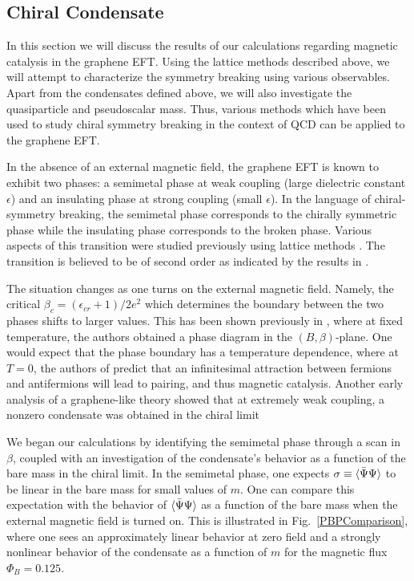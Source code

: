 \documentclass[aps,prd,twocolumn,showpacs,superscriptaddress,groupedaddress]{revtex4}  %
\begin{document}
\subsection{\label{sec:ChiralCond}Chiral Condensate}
In this section we will discuss the results of our calculations regarding magnetic catalysis in the graphene EFT. Using the lattice methods described above, we will attempt to characterize the symmetry breaking using various observables.
Apart from the condensates defined above, we will also investigate the quasiparticle and pseudoscalar mass. Thus, various methods which have been used to study chiral symmetry breaking in the
context of QCD can be applied to the graphene EFT.

In the absence of an external magnetic field, the graphene EFT is known to exhibit two phases: a semimetal phase at weak coupling (large dielectric constant $\epsilon$) and an insulating phase at strong coupling (small $\epsilon$). 
In the language of chiral-symmetry breaking, the semimetal phase corresponds to the chirally symmetric phase while the insulating phase corresponds to the broken phase.
Various aspects of this transition were studied previously using lattice methods \cite{Drut1, Drut2, Hands1, Giedt}. The transition is believed to be of second order as indicated by the results in \cite{Drut2}. 

The situation changes as one turns on the external magnetic field. Namely, the critical $\beta_c = (\epsilon_{cr}+1)/2e^2$ which determines the boundary between the two phases shifts to larger values. This has been shown previously in \cite{Polikarpov}, where at fixed temperature, the authors
obtained a phase diagram in the $(B, \beta)$-plane. One would expect that the phase boundary has a temperature dependence, where at $T=0$, the authors of \cite{Miransky1,Miransky2,Miransky3,Miransky4,MiranskyGraphene1,MiranskyGraphene2,MiranskyGraphene3} predict that an infinitesimal attraction between fermions and antifermions will lead to pairing, and thus magnetic catalysis. Another early analysis of a graphene-like theory showed that at extremely weak coupling, a nonzero condensate was obtained in the chiral limit \cite{Cosmai}

We began our calculations by identifying the semimetal phase through a scan in $\beta$, coupled with an investigation of the condensate's behavior as a function of the bare mass in the chiral limit. In the semimetal phase, one expects $\sigma \equiv {\langle {\bar \Psi}\Psi \rangle}$ to be linear in the bare mass for small values of $m$. 
One can compare this expectation with the behavior of ${\langle {\bar \Psi} \Psi \rangle}$ as a function of the bare mass when the external magnetic field is turned on. This is illustrated in Fig.~\ref{PBPComparison}, where one sees an approximately linear behavior at zero field and a strongly nonlinear behavior of the condensate as a function of $m$ for the magnetic flux $\Phi_B = 0.125$.
\end{document}
